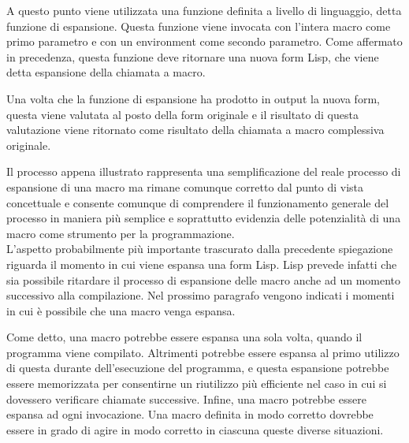 A questo punto viene utilizzata una funzione definita a livello di linguaggio,
detta funzione di espansione. Questa funzione viene invocata con l’intera macro
come primo parametro e con un environment come secondo parametro. Come
affermato in precedenza, questa funzione deve ritornare una nuova form Lisp,
che viene detta espansione della chiamata a macro.

Una volta che la funzione di espansione ha prodotto in output la nuova form,
questa viene valutata al posto della form originale e il risultato di questa
valutazione viene ritornato come risultato della chiamata a macro complessiva
originale.


Il processo appena illustrato rappresenta una semplificazione del reale
processo di espansione di una macro ma rimane comunque corretto dal punto di
vista concettuale e consente comunque di comprendere il funzionamento generale
del processo in maniera più semplice e soprattutto evidenzia delle potenzialità
di una macro come strumento per la programmazione.\\

L’aspetto probabilmente più importante trascurato dalla precedente spiegazione
riguarda il momento in cui viene espansa una form Lisp. Lisp prevede infatti
che sia possibile ritardare il processo di espansione delle macro anche ad un
momento successivo alla compilazione. Nel prossimo paragrafo vengono indicati i
momenti in cui è possibile che una macro venga espansa.

Come detto, una macro potrebbe essere espansa una sola volta, quando il
programma viene compilato. Altrimenti potrebbe essere espansa al primo utilizzo
di questa durante dell’esecuzione del programma, e questa espansione potrebbe
essere memorizzata per consentirne un riutilizzo più efficiente nel caso in cui
si dovessero verificare chiamate successive. Infine, una macro potrebbe essere
espansa ad ogni invocazione. Una macro definita in modo corretto dovrebbe
essere in grado di agire in modo corretto in ciascuna queste diverse
situazioni.

